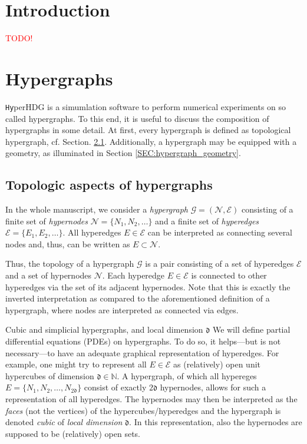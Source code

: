 \documentclass[a4paper, english, 12pt, reqno, draft]{amsart}
\makeatletter
\theoremstyle{definition}
\theoremstyle{remark}
\numberwithin{equation}{section}
\newcommand{\hyperHDG}{{\fontfamily{pzc}\selectfont \texttt{Hy}\hspace{-1.5pt}perHDG }}
\newcommand{\graph}{\ensuremath{\mathcal G}}
\newcommand{\setEdge}{\ensuremath{\mathcal E}}
\newcommand{\setNode}{\ensuremath{\mathcal N}}
\newcommand{\edge}{\ensuremath{E}}
\newcommand{\node}{\ensuremath{N}}
\newcommand{\locDim}{\ensuremath{\mathfrak d}}
\newcommand{\IN}{\ensuremath{\mathbb N}}
\def\paragraph{\@startsection{paragraph}{4}%
  \z@\z@{-\fontdimen2\font}%
  {\normalfont\scshape}}
\makeatother
\begin{document}
\section{Introduction}
% 
\textcolor{red}{TODO!}
\section{Hypergraphs}\label{SEC:hypergraph}
% 
\hyperHDG is a simumlation software to perform numerical experiments on so called hypergraphs. To this end, it is useful to discuss the composition of hypergraphs in some detail. At first, every hypergraph is defined as topological hypergraph, cf. Section. \ref{SEC:hypergraph_topology}. Additionally, a hypergraph may be equipped with a geometry, as illuminated in Section \ref{SEC:hypergraph_geometry}. 
% 
\subsection{Topologic aspects of hypergraphs}\label{SEC:hypergraph_topology}
% 
In the whole manuscript, we consider a \emph{hypergraph} $\graph = (\setNode,\setEdge)$ consisting of a finite set of \emph{hypernodes} $\setNode = \{\node_1, \node_2, \ldots \}$ and a finite set of \emph{hyperedges} $\setEdge = \{\edge_1, \edge_2, \ldots \}$. All hyperedges $\edge \in \setEdge$ can be interpreted as connecting several nodes and, thus, can be written as $\edge \subset \setNode$.

Thus, the topology of a hypergraph $\graph$ is a pair consisting of a set of hyperedges $\setEdge$ and a set of hypernodes $\setNode$. Each hyperedge $\edge \in \setEdge$ is connected to other hyperedges via the set of its adjacent hypernodes. Note that this is exactly the inverted interpretation as compared to the aforementioned definition of a hypergraph, where nodes are interpreted as connected via edges.

\paragraph{Cubic and simplicial hypergraphs, and local dimension $\locDim$}
% 
We will define partial differential equations (PDEs) on hypergraphs. To do so, it helps---but is not necessary---to have an adequate graphical representation of hyperedges. For example, one might try to represent all $\edge \in \setEdge$ as (relatively) open unit hypercubes of dimension $\locDim \in \IN$. A hypergraph, of which all hypereges $\edge = \{ \node_1, \node_2, \ldots, \node_{2\locDim} \}$ consist of exactly $2\locDim$ hypernodes, allows for such a representation of all hyperedges. The hypernodes may then be interpreted as the \emph{faces} (not the vertices) of the hypercubes/hyperedges and the hypergraph is denoted \emph{cubic} of \emph{local dimension} $\locDim$. In this representation, also the hypernodes are supposed to be (relatively) open sets.
\end{document}
